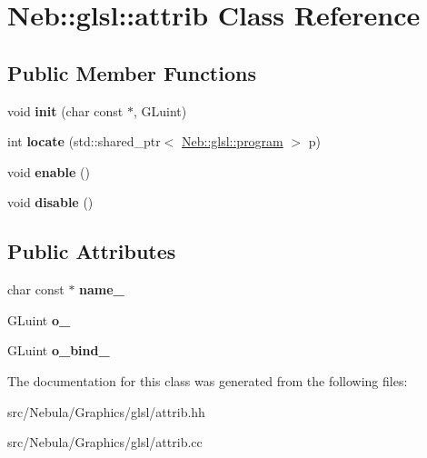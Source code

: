 \hypertarget{classNeb_1_1glsl_1_1attrib}{\section{\-Neb\-:\-:glsl\-:\-:attrib \-Class \-Reference}
\label{classNeb_1_1glsl_1_1attrib}
}
\subsection*{\-Public \-Member \-Functions}
\begin{DoxyCompactItemize}
\item 
\hypertarget{classNeb_1_1glsl_1_1attrib_afb24889a6728269a254336c3f86cd5bc}{void {\bfseries init} (char const $\ast$, \-G\-Luint)}\label{classNeb_1_1glsl_1_1attrib_afb24889a6728269a254336c3f86cd5bc}

\item 
\hypertarget{classNeb_1_1glsl_1_1attrib_a83769556327a84a8bc29d1a65d452f12}{int {\bfseries locate} (std\-::shared\-\_\-ptr$<$ \hyperlink{classNeb_1_1glsl_1_1program}{\-Neb\-::glsl\-::program} $>$ p)}\label{classNeb_1_1glsl_1_1attrib_a83769556327a84a8bc29d1a65d452f12}

\item 
\hypertarget{classNeb_1_1glsl_1_1attrib_a2fad8a1a708d0eb8fdd5bf121623a3d2}{void {\bfseries enable} ()}\label{classNeb_1_1glsl_1_1attrib_a2fad8a1a708d0eb8fdd5bf121623a3d2}

\item 
\hypertarget{classNeb_1_1glsl_1_1attrib_a4625fa64ffbf21dd803410cf1e24c7ec}{void {\bfseries disable} ()}\label{classNeb_1_1glsl_1_1attrib_a4625fa64ffbf21dd803410cf1e24c7ec}

\end{DoxyCompactItemize}
\subsection*{\-Public \-Attributes}
\begin{DoxyCompactItemize}
\item 
\hypertarget{classNeb_1_1glsl_1_1attrib_ace010923299383f6c7f9023906597238}{char const $\ast$ {\bfseries name\-\_\-}}\label{classNeb_1_1glsl_1_1attrib_ace010923299383f6c7f9023906597238}

\item 
\hypertarget{classNeb_1_1glsl_1_1attrib_aa37e743b20a0e901d3274f4b88497195}{\-G\-Luint {\bfseries o\-\_\-}}\label{classNeb_1_1glsl_1_1attrib_aa37e743b20a0e901d3274f4b88497195}

\item 
\hypertarget{classNeb_1_1glsl_1_1attrib_acef1f0c5eb1de70001f4590e33eb9631}{\-G\-Luint {\bfseries o\-\_\-bind\-\_\-}}\label{classNeb_1_1glsl_1_1attrib_acef1f0c5eb1de70001f4590e33eb9631}

\end{DoxyCompactItemize}


\-The documentation for this class was generated from the following files\-:\begin{DoxyCompactItemize}
\item 
src/\-Nebula/\-Graphics/glsl/attrib.\-hh\item 
src/\-Nebula/\-Graphics/glsl/attrib.\-cc\end{DoxyCompactItemize}
